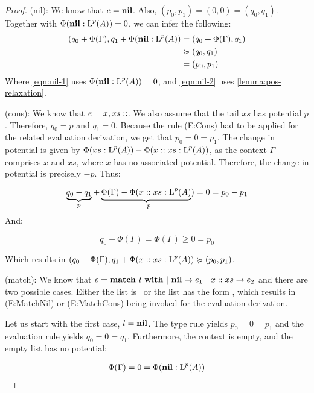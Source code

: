 \begin{proof}
   (nil): We know that \(e = \textbf{nil}\). Also, \((p_0, p_1) = (0, 0) = (q_0, q_1)\). Together with \(\Phi(\textbf{nil} : \text{L}^{p}(A)) = 0\), we can infer the following:
   \begin{align}
      (q_0 + \Phi(\Gamma), q_1 + \Phi(\listnil : \ralist{p}{A})   &= (q_0 + \Phi(\Gamma), q_1)\label{eqn:nil-1} \\
                                                                  &\relaxation (q_0, q_1) \label{eqn:nil-2}\\
                                                                  &= (p_0, p_1)
   \end{align}
   Where \cref{eqn:nil-1} uses \(\Phi(\textbf{nil}: \text{L}^{p}(A)) = 0\), and \cref{eqn:nil-2} uses \cref{lemma:pos-relaxation}. 

   (cons): We know that \(e = x, xs :: \). We also assume that the tail \(xs\) has potential \(p\). Therefore, \(q_0 = p\) and \(q_1 = 0\). Because the rule (E:Cons) had to be applied for the related evaluation derivation, we get that \(p_0 = 0 = p_1\).   
   The change in potential is given by \(\Phi(xs : \text{L}^{p}(A)) - \Phi(x :: xs : \text{L}^{p}(A))\), as the context \(\Gamma\) comprises \(x\) and \(xs\), where \(x\) has no associated potential. Therefore, the change in potential is precisely \(-p\). Thus:

   \[
      \underbrace{q_0 - q_1}_{p} + \underbrace{\Phi(\Gamma) - \Phi(x :: xs : \text{L}^{p}(A)}_{-p}) = 0 = p_0 - p_1
   \] 
   And:

   \[
      q_0 + \Phi(\Gamma) = \Phi(\Gamma) \geq 0 = p_0
   \]

   Which results in \((q_0 + \Phi(\Gamma), q_1 + \Phi(x :: xs : \text{L}^{p}(A)) \succcurlyeq (p_0, p_1)\). 

   (match): We know that \(e = \textbf{match } l~\textbf{with}~|~\textbf{nil} \to e_1~|~x :: xs \to e_2\) and there are two possible cases. Either the list is \listnil ~or the list has the form , which results in (E:MatchNil) or (E:MatchCons) being invoked for the evaluation derivation. 

   Let us start with the first case, \(l = \textbf{nil}\). The type rule yields \(p_0 = 0 = p_1\) and the evaluation rule yields \(q_0 = 0 = q_1\). Furthermore, the context is empty, and the empty list has no potential:

   \begin{align*}
      \Phi(\Gamma) = 0 = \Phi(\textbf{nil} : \text{L}^{p}(A))\\
   \end{align*}


\end{proof}
